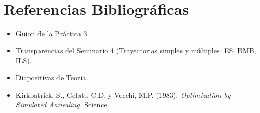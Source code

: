 \documentclass[12pt, a4paper]{article}
\begin{document}
\hypersetup{pageanchor=false}

\hypersetup{pageanchor=true}
\newpage

\tableofcontents
\newpage








\newpage
{}

\section*{Referencias Bibliográficas}
\begin{itemize}
    \item Guion de la Práctica 3.
    \item Transparencias del Seminario 4 (Trayectorias simples y múltiples: ES, BMB, ILS).
    \item Diapositivas de Teoría.
    \item Kirkpatrick, S., Gelatt, C.D. y Vecchi, M.P. (1983). \textit{Optimization by Simulated Annealing}. Science.
\end{itemize}
\end{document}

